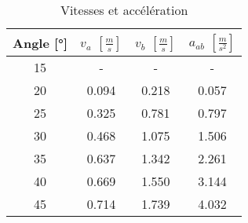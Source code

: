 \begin{table}
\centering
\begin{tabular}{|c|c|c|c|}
\hline
Angle [°] &$v_a$ $\left[ \frac{m}{s} \right]$ & $v_b$ $\left[ \frac{m}{s} \right]$ & $a_{ab}$ $\left[ \frac{m}{s^2} \right]$ \\
           \hline
15        &- & - & - \\
           \hline
20        &0.094 & 0.218 & 0.057 \\
           \hline
25        &0.325 & 0.781 & 0.797 \\
           \hline
30        &0.468 & 1.075 & 1.506 \\
           \hline
35        &0.637 & 1.342 & 2.261 \\
           \hline
40        &0.669 & 1.550 & 3.144 \\
           \hline
45        &0.714 & 1.739 & 4.032 \\
           \hline
\end{tabular}
\caption{Vitesses et accélération}
\label{table:v-abp}
\end{table}
